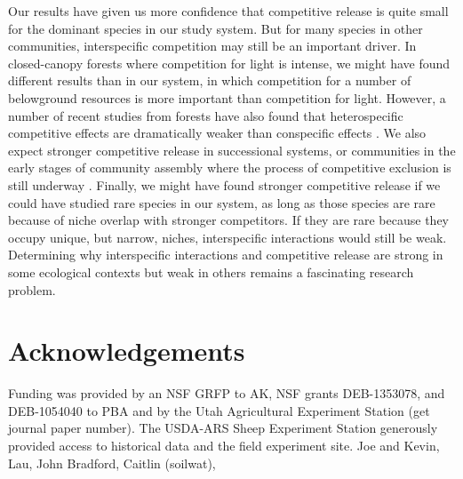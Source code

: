 \documentclass[11pt]{article}
\begin{document}
\begin{doublespacing}
Our results have given us more confidence that competitive release is quite small for the dominant species in our study system. But for many species in other communities, interspecific competition may still be an important driver. In closed-canopy forests where competition for light is intense, we might have found different results than in our system, in which competition for a number of belowground resources is more important than competition for light. However, a number of recent studies from forests have also found that heterospecific competitive effects are dramatically weaker than conspecific effects \citep{comita_asymmetric_2010,kunstler_plant_2015,johnson_conspecific_2012}. We also expect stronger competitive release in successional systems, or communities in the early stages of community assembly where the process of competitive exclusion is still underway \citep{kokkoris_patterns_1999}. Finally, we might have found stronger competitive release if we could have studied rare species in our system, as long as those species are rare because of niche overlap with stronger competitors. If they are rare because they occupy unique, but narrow, niches, interspecific interactions would still be weak. Determining why interspecific interactions and competitive release are strong in some ecological contexts but weak in others remains a fascinating research problem. 
  
\section*{Acknowledgements}

Funding was provided by an NSF GRFP to AK, NSF grants DEB-1353078, and DEB-1054040 to PBA and by the Utah Agricultural Experiment Station (get journal paper number). The USDA-ARS Sheep Experiment Station generously provided access to historical data and the field experiment site. Joe and Kevin, Lau, John Bradford, Caitlin (soilwat), 

\newpage




\end{doublespacing} 

\end{document}
